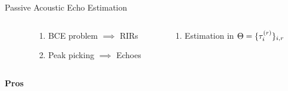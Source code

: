 \begin{frame}[t]{Passive Acoustic Echo Estimation \hfill\faPalette}
        \vspace{.5em}
        \begin{columns}[T,onlytextwidth] %
            \begin{column}{.02\textwidth}
            \end{column}

            \begin{column}{.48\textwidth}
                \begin{enumerate}
                    \item BCE problem $\implies$ RIRs
                    \item Peak picking $\implies$ Echoes
                \end{enumerate}
            \end{column}
            \begin{column}{.48\textwidth}
                \begin{enumerate}
                    \item Estimation in $\Theta = \{\tau_i^{(r)}\}_{i,r}$ %
                \end{enumerate}
            \end{column}%
        \end{columns}

        \vspace{1em}
        \begin{columns}[onlytextwidth] %
            \begin{column}{.02\textwidth}
                \textcolor{mygreen}{\textbf{Pros}}
            \end{column}


\end{columns}
\end{frame}
